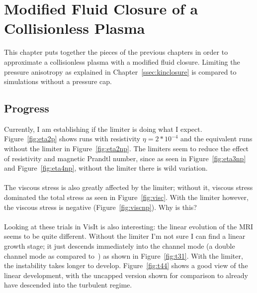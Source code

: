 \chapter{Modified Fluid Closure of a Collisionless Plasma}\label{chap:kinbrag}
This chapter puts together the pieces of the previous chapters in order to approximate a collisionless plasma with a modified fluid closure. Limiting the pressure anisotropy as explained in Chapter~\ref{ssec:kinclosure} is compared to simulations without a pressure cap.

\section{Progress}
Currently, I am establishing if the limiter is doing what I expect. Figure~\ref{fig:eta2p} shows runs with resistivity $\eta=2*10^{-4}$ and the equivalent runs without the limiter in Figure~\ref{fig:eta2np}. The limiters seem to reduce the effect of resistivity and magnetic Prandtl number, since as seen in Figure~\ref{fig:eta3np} and Figure~\ref{fig:eta4np}, without the limiter there is wild variation. \\
\\
The viscous stress is also greatly affected by the limiter; without it, viscous stress dominated the total stress as seen in Figure~\ref{fig:visc}. With the limiter however, the viscous stress is negative (Figure~\ref{fig:viscnp}). Why is this?\\
\\
Looking at these trials in VisIt is also interesting: the linear evolution of the MRI seems to be quite different. Without the limiter I'm not sure I can find a linear growth stage; it just descends immediately into the channel mode (a double channel mode as compared to~) as shown in Figure~\ref{fig:t31}. With the limiter, the instability takes longer to develop. Figure~\ref{fig:t44} shows a good view of the linear development, with the uncapped version shown for comparison to already have descended into the turbulent regime.


